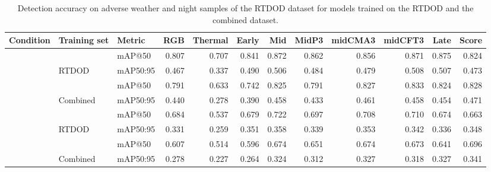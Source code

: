 \documentclass[12pt,oneside,bibtotoc,liststotoc]{scrbook}
\begin{document}
\begin{table}[H]
    \centering
    \caption{Detection accuracy on adverse weather and night samples of the RTDOD dataset
        for models trained on the RTDOD and the combined dataset.}
    \label{tab:acc_weather_night}
    \begin{adjustbox}{max width=\textwidth}
        \begin{tabular}{|l l l r r r r r r r r r|}
            \toprule
            \rowcolor{white}
            \textbf{Condition} & \textbf{Training set} & \textbf{Metric}
                               & \textbf{RGB}     & \textbf{Thermal} & \textbf{Early}
                               & \textbf{Mid}     & \textbf{MidP3}   & \textbf{midCMA3}
                               & \textbf{midCFT3} & \textbf{Late}    & \textbf{Score} \\
            \midrule
            \rowcolor{rowlight} &                           & mAP@50   & 0.807 & 0.707 & 0.841 & 0.872 & 0.862 & 0.856 & 0.871 & 0.875 & 0.824 \\
            \rowcolor{rowlight} & \multirow{-2}{*}{RTDOD}   & mAP50:95 & 0.467 & 0.337 & 0.490 & 0.506 & 0.484 & 0.479 & 0.508 & 0.507 & 0.473 \\
                               \cmidrule{2-12}
            \rowcolor{rowlight} &                           & mAP@50   & 0.791 & 0.633 & 0.742 & 0.825 & 0.791 & 0.827 & 0.833 & 0.824 & 0.828 \\
            \rowcolor{rowlight} \multirow{-4}{*}{Adverse Weather} & \multirow{-2}{*}{Combined} & mAP50:95 & 0.440 & 0.278 & 0.390 & 0.458 & 0.433 & 0.461 & 0.458 & 0.454 & 0.471 \\
            \midrule
            \rowcolor{rowdark}  &                           & mAP@50   & 0.684 & 0.537 & 0.679 & 0.722 & 0.697 & 0.708 & 0.710 & 0.674 & 0.663 \\
            \rowcolor{rowdark}  & \multirow{-2}{*}{RTDOD}   & mAP50:95 & 0.331 & 0.259 & 0.351 & 0.358 & 0.339 & 0.353 & 0.342 & 0.336 & 0.348 \\
                               \cmidrule{2-12}
            \rowcolor{rowdark}  &                           & mAP@50   & 0.607 & 0.514 & 0.596 & 0.674 & 0.651 & 0.674 & 0.673 & 0.641 & 0.696 \\
            \rowcolor{rowdark} \multirow{-4}{*}{Night} & \multirow{-2}{*}{Combined} & mAP50:95 & 0.278 & 0.227 & 0.264 & 0.324 & 0.312 & 0.327 & 0.318 & 0.327 & 0.341 \\
            \bottomrule
        \end{tabular}
    \end{adjustbox}
\end{table}

\newpage

%
%


\end{document}
